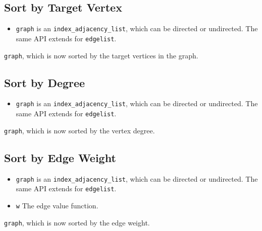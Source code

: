 \subsection{Sort by Target Vertex}
{\small
      
}
\begin{itemdescr}
    \pnum\preconditions
    \begin{itemize}
          \item
                \lstinline{graph} is an \lstinline{index_adjacency_list}, which can be directed or undirected. The same API extends for \lstinline{edgelist}.
    \end{itemize}
    \pnum\effects \lstinline{graph}, which is now sorted by the target vertices in the graph.
\end{itemdescr}

\subsection{Sort by Degree}
{\small
      
}
\begin{itemdescr}
    \pnum\preconditions
    \begin{itemize}
          \item
                \lstinline{graph} is an \lstinline{index_adjacency_list}, which can be directed or undirected. The same API extends for \lstinline{edgelist}.
    \end{itemize}
    \pnum\effects \lstinline{graph}, which is now sorted by the vertex degree.
\end{itemdescr}

\subsection{Sort by Edge Weight}
{\small
      
}
\begin{itemdescr}
    \pnum\preconditions
    \begin{itemize}
          \item
                \lstinline{graph} is an \lstinline{index_adjacency_list}, which can be directed or undirected. The same API extends for \lstinline{edgelist}.
          \item
                \lstinline{w} The edge value function.
    \end{itemize}
    \pnum\effects \lstinline{graph}, which is now sorted by the edge weight.
\end{itemdescr}

